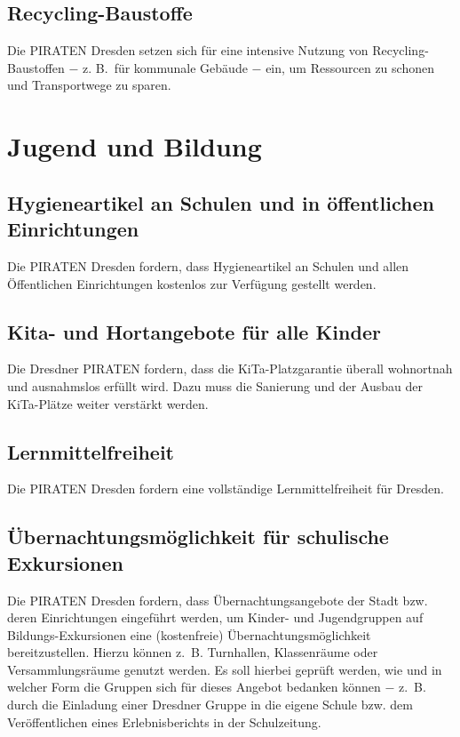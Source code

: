 \documentclass[a4paper, 11pt]{article}
\begin{document}
\subsection{Recycling-Baustoffe}
Die PIRATEN Dresden setzen sich für eine intensive Nutzung von Recycling-Baustoffen $-$ z. B.~für kommunale Gebäude $-$ ein, um Ressourcen zu schonen und Transportwege zu sparen.


\section{Jugend und Bildung}

\subsection{Hygieneartikel an Schulen und in öffentlichen Einrichtungen}
Die PIRATEN Dresden fordern, dass Hygieneartikel an Schulen und allen Öffentlichen Einrichtungen kostenlos zur Verfügung gestellt werden.


\subsection{Kita- und Hortangebote für alle Kinder}
Die Dresdner PIRATEN fordern, dass die KiTa-Platzgarantie überall wohnortnah und ausnahmslos erfüllt wird. Dazu muss die Sanierung und der Ausbau der KiTa-Plätze weiter verstärkt werden.


\subsection{Lernmittelfreiheit}
Die PIRATEN Dresden fordern eine vollständige Lernmittelfreiheit für Dresden.


\subsection{Übernachtungsmöglichkeit für schulische Exkursionen}
Die PIRATEN Dresden fordern, dass Übernachtungsangebote der Stadt bzw. deren Einrichtungen eingeführt werden, um Kinder- und Jugendgruppen auf Bildungs-Exkursionen eine (kostenfreie) Übernachtungsmöglichkeit bereitzustellen. Hierzu können z. B. Turnhallen, Klassenräume oder Versammlungsräume genutzt werden. Es soll hierbei geprüft werden, wie und in welcher Form die Gruppen sich für dieses Angebot bedanken können $-$ z. B.~ durch die Einladung einer Dresdner Gruppe in die eigene Schule bzw. dem Veröffentlichen eines Erlebnisberichts in der Schulzeitung.
\end{document}
